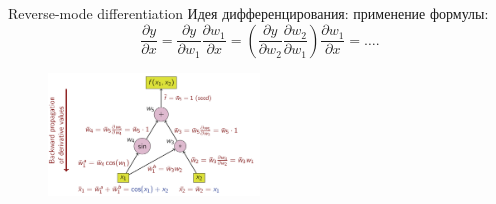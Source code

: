 \documentclass[10pt,pdf,utf8,russian,aspectratio=169]{beamer}
\begin{document}
\begin{frame}{Reverse-mode differentiation}
Идея дифференцирования: применение формулы:
\[
    \frac{\partial{y}}{\partial{x}}  = \frac{\partial{y}}{\partial{w_1}}\frac{\partial{w_1}}{\partial{x}} = \left(\frac{\partial{y}}{\partial{w_2}}\frac{\partial{w_2}}{\partial{w_1}}\right)\frac{\partial{w_1}}{\partial{x}} = \dots. 
\]

\begin{figure}
\centering
\includegraphics[width=0.5\textwidth]{rmd.png}
\end{figure}
\end{frame}
\end{document}
